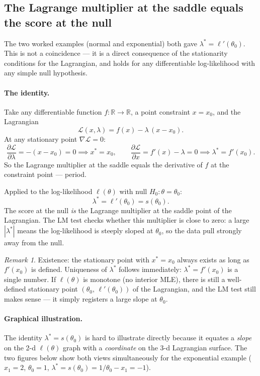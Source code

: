 \documentclass[a4paper,oneside,12pt]{extarticle}
\theoremstyle{plain}
\theoremstyle{definition}
\theoremstyle{remark}
\newtheorem{remark}[proposition]{Remark}
\begin{document}
\subsection{The Lagrange multiplier at the saddle equals the score at the null}
\label{subsec:lm_lemma}

The two worked examples (normal and exponential) both gave
$\lambda^* = \ell'(\theta_0)$.  This is not a coincidence —
it is a direct consequence of the stationarity conditions for
the Lagrangian, and holds for any differentiable log-likelihood
with any simple null hypothesis.

\paragraph{The identity.}
Take any differentiable function $f:\mathbb{R}\to\mathbb{R}$,
a point constraint $x = x_0$, and the Lagrangian
\[
  \mathcal{L}(x,\lambda) = f(x) - \lambda\,(x - x_0).
\]
At any stationary point $\nabla\mathcal{L} = 0$:
\[
  \frac{\partial\mathcal{L}}{\partial\lambda} = -(x - x_0) = 0
  \implies x^* = x_0,
  \qquad
  \frac{\partial\mathcal{L}}{\partial x} = f'(x) - \lambda = 0
  \implies \lambda^* = f'(x_0).
\]
So the Lagrange multiplier at the saddle equals the derivative of $f$
at the constraint point — period.

Applied to the log-likelihood $\ell(\theta)$ with null $H_0:\theta=\theta_0$:
\[
  \boxed{\lambda^* = \ell'(\theta_0) = s(\theta_0).}
\]
The score at the null \emph{is} the Lagrange multiplier at the
saddle point of the Lagrangian.  The LM test checks whether this
multiplier is close to zero: a large $|\lambda^*|$ means
the log-likelihood is steeply sloped at $\theta_0$, so the data
pull strongly away from the null.

\begin{remark}
Existence: the stationary point with $x^* = x_0$ always exists
as long as $f'(x_0)$ is defined.  Uniqueness of $\lambda^*$
follows immediately: $\lambda^* = f'(x_0)$ is a single number.
If $\ell(\theta)$ is monotone (no interior MLE), there is still a
well-defined stationary point $(\theta_0,\, \ell'(\theta_0))$ of the
Lagrangian, and the LM test still makes sense — it simply registers
a large slope at $\theta_0$.
\end{remark}

\paragraph{Graphical illustration.}
The identity $\lambda^* = s(\theta_0)$ is hard to illustrate
directly because it equates a \emph{slope} on the 2-d
$\ell(\theta)$ graph with a \emph{coordinate} on the 3-d
Lagrangian surface.  The two figures below show both views
simultaneously for the exponential example ($x_1=2$, $\theta_0=1$,
$\lambda^* = s(\theta_0) = 1/\theta_0 - x_1 = -1$).
\end{document}
